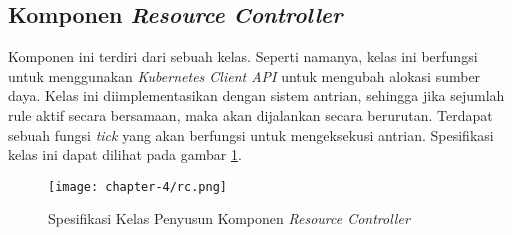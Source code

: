 \subsection{Komponen \textit{Resource Controller}}

Komponen ini terdiri dari sebuah kelas. Seperti namanya, kelas ini berfungsi untuk menggunakan \textit{Kubernetes Client API} untuk mengubah alokasi sumber daya. Kelas ini diimplementasikan dengan sistem antrian, sehingga jika sejumlah rule aktif secara bersamaan, maka akan dijalankan secara berurutan. Terdapat sebuah fungsi \textit{tick} yang akan berfungsi untuk mengeksekusi antrian. Spesifikasi kelas ini dapat dilihat pada gambar \ref{fig:rc-spek}.

\begin{figure}[h]
    \centering
    \texttt{[image: chapter-4/rc.png]}
    \caption{Spesifikasi Kelas Penyusun Komponen \textit{Resource Controller}}
    \label{fig:rc-spek}
\end{figure}

